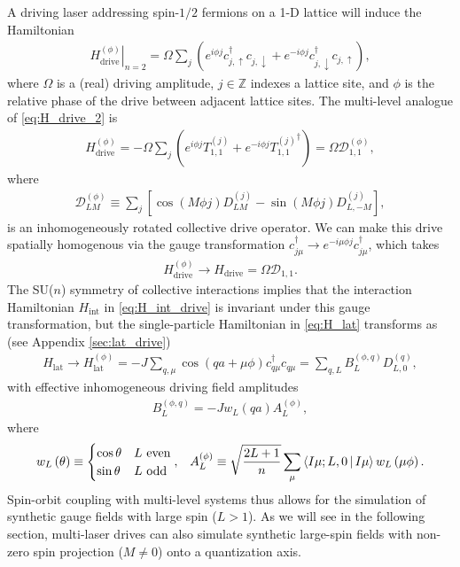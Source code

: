 \documentclass[nofootinbib,notitlepage,11pt]{revtex4-2}
\renewcommand{\t}{\text} %
\newcommand{\f}[2]{\dfrac{#1}{#2}} %
\newcommand{\p}[1]{\left(#1\right)} %
\renewcommand{\sp}[1]{\left[#1\right]} %
\newcommand{\bk}{\Braket} %
\newcommand{\1}{\mathds{1}}
\newcommand{\up}{\uparrow}
\newcommand{\dn}{\downarrow}
\newcommand{\D}{\mathcal{D}}
\begin{document}
A driving laser addressing spin-$1/2$ fermions on a 1-D lattice will
induce the Hamiltonian
\begin{align}
  \left. H_{\t{drive}}^{(\phi)} \right|_{n=2}
  = \Omega \sum_j
  \p{e^{i\phi j} c_{j,\up}^\dag c_{j,\dn}
    + e^{-i\phi j} c_{j,\dn}^\dag c_{j,\up}},
  \label{eq:H_drive_2}
\end{align}
where $\Omega$ is a (real) driving amplitude, $j\in\mathbb{Z}$ indexes
a lattice site, and $\phi$ is the relative phase of the drive between
adjacent lattice sites.  The multi-level analogue of
\eqref{eq:H_drive_2} is
\begin{align}
  H_{\t{drive}}^{(\phi)}
  = -\Omega \sum_j \p{e^{i\phi j} T_{1,1}^{(j)}
    + e^{-i\phi j} {T_{1,1}^{(j)}}^\dag}
  = \Omega \D_{1,1}^{(\phi)},
  \label{eq:H_drive}
\end{align}
where
\begin{align}
  \D_{LM}^{(\phi)}
  \equiv \sum_j \sp{\cos\p{M\phi j} D_{LM}^{(j)}
    - \sin\p{M\phi j} D_{L,-M}^{(j)}},
  \label{eq:drive_rot}
\end{align}
is an inhomogeneously rotated collective drive operator.  We can make
this drive spatially homogenous via the gauge transformation
$c_{j\mu}^\dag \to e^{-i\mu\phi j} c_{j\mu}^\dag$, which takes
\begin{align}
  H_{\t{drive}}^{(\phi)} \to H_{\t{drive}} = \Omega \D_{1,1}.
\end{align}
The SU($n$) symmetry of collective interactions implies that the
interaction Hamiltonian $H_{\t{int}}$ in \eqref{eq:H_int_drive} is
invariant under this gauge transformation, but the single-particle
Hamiltonian in \eqref{eq:H_lat} transforms as (see Appendix
\ref{sec:lat_drive})
\begin{align}
  H_{\t{lat}}
  \to H_{\t{lat}}^{(\phi)}
  = -J \sum_{q,\mu} \cos\p{qa+\mu\phi} c_{q\mu}^\dag c_{q\mu}
  = \sum_{q,L} B_L^{(\phi,q)} D_{L,0}^{(q)},
  \label{eq:H_lat_SOC}
\end{align}
with effective inhomogeneous driving field amplitudes
\begin{align}
  B_L^{(\phi,q)} = -J w_L\p{qa} A_L^{(\phi)},
\end{align}
where
\begin{align}
  w_L\p{\theta} \equiv
  \begin{cases}
    \cos\theta & L~\t{even} \\
    \sin\theta & L~\t{odd}
  \end{cases},
  &&
  A_L^{(\phi)} \equiv \sqrt{\f{2L+1}{n}}
  \sum_\mu \bk{I\mu;L,0|I\mu} w_L\p{\mu\phi}.
\end{align}
Spin-orbit coupling with multi-level systems thus allows for the
simulation of synthetic gauge fields with large spin ($L>1$).  As we
will see in the following section, multi-laser drives can also
simulate synthetic large-spin fields with non-zero spin projection
($M\ne0$) onto a quantization axis.
\end{document}
